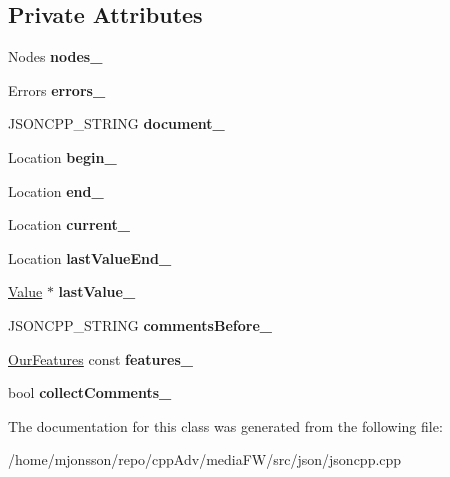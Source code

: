 \subsection*{Private Attributes}
\begin{DoxyCompactItemize}
\item 
\mbox{\label{classJson_1_1OurReader_a19cc4e8c5d17ee6822f752e9a36f4ce3}} 
Nodes {\bfseries nodes\+\_\+}
\item 
\mbox{\label{classJson_1_1OurReader_afb76b68ba1ab68fe09cf2838e3d4898d}} 
Errors {\bfseries errors\+\_\+}
\item 
\mbox{\label{classJson_1_1OurReader_a726230af83d22d25e0c76cec3408ecf1}} 
J\+S\+O\+N\+C\+P\+P\+\_\+\+S\+T\+R\+I\+NG {\bfseries document\+\_\+}
\item 
\mbox{\label{classJson_1_1OurReader_a9bda9d72335d52cd06e65f9eca3f70f5}} 
Location {\bfseries begin\+\_\+}
\item 
\mbox{\label{classJson_1_1OurReader_ab1f69b0260c27a0d2d65dc56e42c8f9d}} 
Location {\bfseries end\+\_\+}
\item 
\mbox{\label{classJson_1_1OurReader_a5211fbbba94be80a22dd2317c621efcc}} 
Location {\bfseries current\+\_\+}
\item 
\mbox{\label{classJson_1_1OurReader_a101eadc45e01c60628b53f0db3d13482}} 
Location {\bfseries last\+Value\+End\+\_\+}
\item 
\mbox{\label{classJson_1_1OurReader_a9f994b6a2227c5d96e6ed6cbc74ed251}} 
\hyperlink{classJson_1_1Value}{Value} $\ast$ {\bfseries last\+Value\+\_\+}
\item 
\mbox{\label{classJson_1_1OurReader_a9c53e77e290eb9081298210a955fda6a}} 
J\+S\+O\+N\+C\+P\+P\+\_\+\+S\+T\+R\+I\+NG {\bfseries comments\+Before\+\_\+}
\item 
\mbox{\label{classJson_1_1OurReader_a2714302d5cc54ca2ce4118ea51c0397a}} 
\hyperlink{classJson_1_1OurFeatures}{Our\+Features} const {\bfseries features\+\_\+}
\item 
\mbox{\label{classJson_1_1OurReader_a259f6ac988da2894bcafc670e42f73ad}} 
bool {\bfseries collect\+Comments\+\_\+}
\end{DoxyCompactItemize}


The documentation for this class was generated from the following file\+:\begin{DoxyCompactItemize}
\item 
/home/mjonsson/repo/cpp\+Adv/media\+F\+W/src/json/jsoncpp.\+cpp\end{DoxyCompactItemize}
